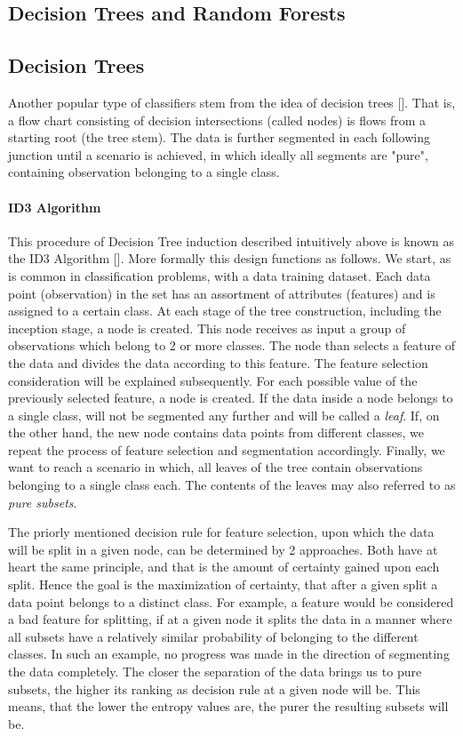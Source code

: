 \subsection*{Decision Trees and Random Forests}
	\subsection*{Decision Trees}
		Another popular type of classifiers stem from the idea of decision trees [\cite{quinlan2014c4}]. That is, a flow chart consisting of decision intersections (called nodes) is flows from a starting root (the tree stem). The data is further segmented in each following junction until  a scenario is achieved, in which ideally all segments are "pure", containing observation belonging to a single class. 
		
		\paragraph{ID3 Algorithm} 
			This procedure of Decision Tree induction described intuitively above is known as the ID3 Algorithm [\cite{quinlan1986induction}]. More formally this design functions as follows. We start, as is common in classification problems, with a data training dataset. Each data point (observation) in the set has an assortment of attributes (features) and is assigned to a certain class. At each stage of the tree construction, including the inception stage, a node is created. This node receives as input a group of observations which belong to 2 or more classes. The node than selects a feature of the data and divides the data according to this feature. The feature selection consideration will be explained subsequently. For each possible value of the previously selected feature, a node is created. If the data inside a node belongs to a single class, will not be segmented any further and will be called a \textit{leaf}. If, on the other hand, the new node contains data points from different classes, we repeat the process of feature selection and segmentation accordingly. Finally, we want to reach a scenario in which, all leaves of the tree contain observations belonging to a single class each. The contents of the leaves may also referred to as \textit{pure subsets}.
			
			\par
			The priorly mentioned decision rule for feature selection, upon which the data will be split in a given node, can be determined by 2 approaches. Both have at heart the same principle, and that is the amount of certainty gained upon each split. Hence the goal is the maximization of certainty, that after a given split a data point belongs to a distinct class. For example, a feature would be considered a bad feature for splitting, if at a given node it splits the data in a manner where all subsets have a relatively similar probability of belonging to the different classes. In such an example, no progress was made in the direction of segmenting the data completely. The closer the separation of the data brings us to pure subsets, the higher its ranking as decision rule at a given node will be. This means, that the lower the entropy values are, the purer the resulting subsets will be.
			
